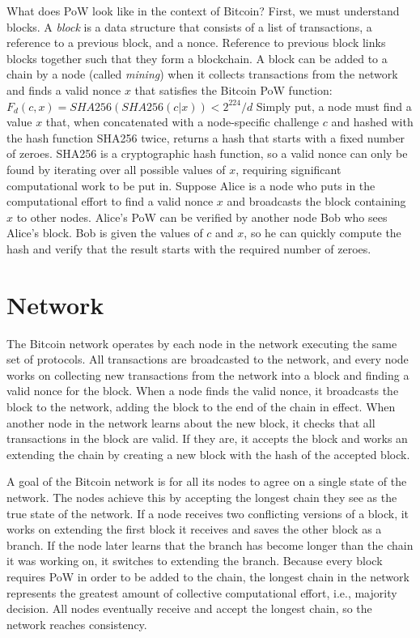 \documentclass{article}
\begin{document}
What does PoW look like in the context of Bitcoin? First, we must understand blocks. A \emph{block} is a data structure that consists of a list of transactions, a reference to a previous block, and a nonce. Reference to previous block links blocks together such that they form a blockchain. A block can be added to a chain by a node (called \emph{mining}) when it collects transactions from the network and finds a valid nonce $x$ that satisfies the Bitcoin PoW function:\newline
$F_d (c,x) = SHA256(SHA256(c|x)) < 2^{224}/d$\newline
Simply put, a node must find a value $x$ that, when concatenated with a node-specific challenge $c$ and hashed with the hash function SHA256 twice, returns a hash that starts with a fixed number of zeroes. SHA256 is a cryptographic hash function, so a valid nonce can only be found by iterating over all possible values of $x$, requiring significant computational work to be put in. Suppose Alice is a node who puts in the computational effort to find a valid nonce $x$ and broadcasts the block containing $x$ to other nodes. Alice’s PoW can be verified by another node Bob who sees Alice’s block. Bob is given the values of $c$ and $x$, so he can quickly compute the hash and verify that the result starts with the required number of zeroes.

\section{Network}
The Bitcoin network operates by each node in the network executing the same set of protocols. All transactions are broadcasted to the network, and every node works on collecting new transactions from the network into a block and finding a valid nonce for the block. When a node finds the valid nonce, it broadcasts the block to the network, adding the block to the end of the chain in effect. When another node in the network learns about the new block, it checks that all transactions in the block are valid. If they are, it accepts the block and works an extending the chain by creating a new block with the hash of the accepted block.

A goal of the Bitcoin network is for all its nodes to agree on a single state of the network. The nodes achieve this by accepting the longest chain they see as the true state of the network. If a node receives two conflicting versions of a block, it works on extending the first block it receives and saves the other block as a branch. If the node later learns that the branch has become longer than the chain it was working on, it switches to extending the branch. Because every block requires PoW in order to be added to the chain, the longest chain in the network represents the greatest amount of collective computational effort, i.e., majority decision. All nodes eventually receive and accept the longest chain, so the network reaches consistency.
\end{document}

